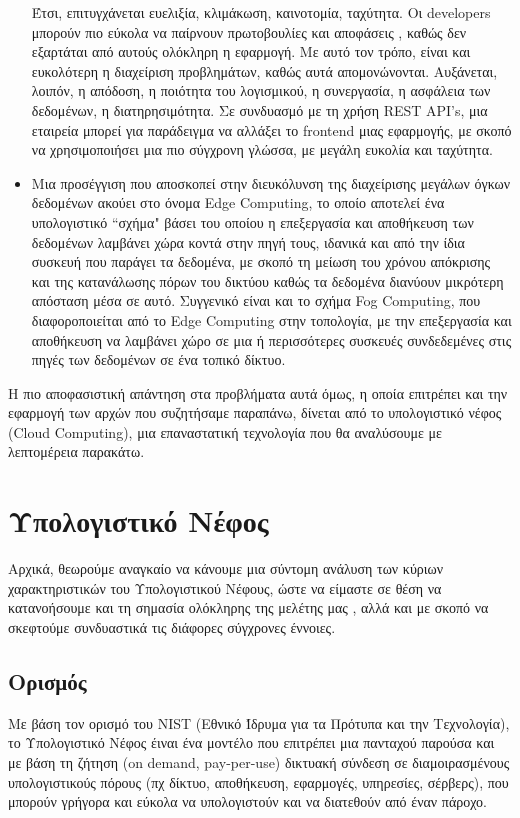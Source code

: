 \documentclass{article}
\begin{document}
\begin{itemize}
Έτσι, επιτυγχάνεται ευελιξία, κλιμάκωση, καινοτομία, ταχύτητα. Οι developers μπορούν πιο εύκολα να παίρνουν πρωτοβουλίες και αποφάσεις , καθώς δεν εξαρτάται από αυτούς ολόκληρη η εφαρμογή. Με αυτό τον τρόπο, είναι και ευκολότερη η διαχείριση προβλημάτων, καθώς αυτά απομονώνονται. Αυξάνεται, λοιπόν, η απόδοση, η ποιότητα του λογισμικού, η συνεργασία, η ασφάλεια των δεδομένων, η διατηρησιμότητα. 
Σε συνδυασμό με τη χρήση REST API's, μια εταιρεία μπορεί για παράδειγμα να αλλάξει το frontend μιας εφαρμογής, με σκοπό να χρησιμοποιήσει μια πιο σύγχρονη γλώσσα, με μεγάλη ευκολία και ταχύτητα.
\item Μια προσέγγιση που αποσκοπεί στην διευκόλυνση της διαχείρισης μεγάλων όγκων δεδομένων ακούει στο όνομα Edge Computing, το οποίο αποτελεί ένα υπολογιστικό “σχήμα" βάσει του οποίου η επεξεργασία και αποθήκευση των δεδομένων λαμβάνει χώρα κοντά στην πηγή τους, ιδανικά και από την ίδια συσκευή που παράγει τα δεδομένα, με σκοπό τη μείωση του χρόνου απόκρισης και της κατανάλωσης πόρων του δικτύου καθώς τα δεδομένα διανύουν μικρότερη απόσταση μέσα σε αυτό. Συγγενικό είναι και το σχήμα Fog Computing, που διαφοροποιείται από το Edge Computing στην τοπολογία, με την επεξεργασία και αποθήκευση να λαμβάνει χώρο σε μια ή περισσότερες συσκευές συνδεδεμένες στις πηγές των δεδομένων σε ένα τοπικό δίκτυο.


\end{itemize}
Η πιο αποφασιστική απάντηση στα προβλήματα αυτά όμως, η οποία επιτρέπει και την εφαρμογή των αρχών που συζητήσαμε παραπάνω, δίνεται από το υπολογιστικό νέφος (Cloud Computing), μια επαναστατική τεχνολογία που θα αναλύσουμε με λεπτομέρεια παρακάτω.




\section{Υπολογιστικό Νέφος}
Αρχικά, θεωρούμε αναγκαίο να κάνουμε μια σύντομη ανάλυση των κύριων χαρακτηριστικών του Υπολογιστικού Νέφους, ώστε να είμαστε σε θέση να κατανοήσουμε και τη σημασία ολόκληρης της μελέτης μας , αλλά και με σκοπό να σκεφτούμε συνδυαστικά τις διάφορες σύγχρονες έννοιες.
\subsection{Ορισμός}
Με βάση τον ορισμό του NIST (Εθνικό Ίδρυμα για τα Πρότυπα και την Τεχνολογία), το Υπολογιστικό Νέφος έιναι ένα μοντέλο που επιτρέπει μια πανταχού παρούσα και με βάση τη ζήτηση (on demand, pay-per-use) δικτυακή σύνδεση σε διαμοιρασμένους υπολογιστικούς πόρους (πχ δίκτυο, αποθήκευση, εφαρμογές, υπηρεσίες, σέρβερς), που μπορούν γρήγορα και εύκολα να υπολογιστούν και να διατεθούν από έναν πάροχο.
\end{document}
